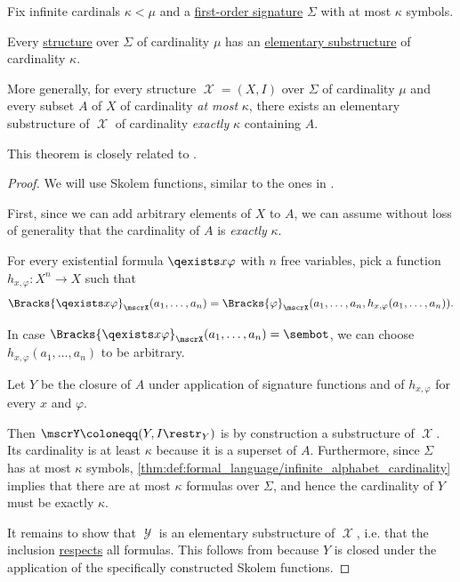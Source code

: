 \begin{theorem}\label{thm:downward_lowenheim_skolem_theorem}
  Fix infinite cardinals \( \kappa < \mu \) and a \hyperref[def:fol_signature]{first-order signature} \( \Sigma \) with at most \( \kappa \) symbols.

  Every \hyperref[def:fol_structure]{structure} over \( \Sigma \) of cardinality \( \mu \) has an \hyperref[def:elementary_embedding]{elementary substructure} of cardinality \( \kappa \).

  More generally, for every structure \( \mscrX = (X, I) \) over \( \Sigma \) of cardinality \( \mu \) and every subset \( A \) of \( X \) of cardinality \emph{at most} \( \kappa \), there exists an elementary substructure of \( \mscrX \) of cardinality \emph{exactly} \( \kappa \) containing \( A \).
\end{theorem}
\begin{comments}
  \item This theorem is closely related to .
\end{comments}
\begin{proof}
  We will use Skolem functions, similar to the ones in .

  First, since we can add arbitrary elements of \( X \) to \( A \), we can assume without loss of generality that the cardinality of \( A \) is \emph{exactly} \( \kappa \).

  For every existential formula \( \qexists x \varphi \) with \( n \) free variables, pick a function \( h_{x,\varphi}: X^n \to X \) such that
  \begin{equation*}
    \Bracks{\qexists x \varphi}_\mscrX(a_1, \ldots, a_n) = \Bracks{\varphi}_\mscrX(a_1, \ldots, a_n, h_{x,\varphi}(a_1, \ldots, a_n)).
  \end{equation*}

  In case \( \Bracks{\qexists x \varphi}_\mscrX(a_1, \ldots, a_n) = \sembot \), we can choose \( h_{x,\varphi}(a_1, \ldots, a_n) \) to be arbitrary.

  Let \( Y \) be the closure of \( A \) under application of signature functions and of \( h_{x,\varphi} \) for every \( x \) and \( \varphi \).

  Then \( \mscrY \coloneqq (Y, I\restr_Y) \) is by construction a substructure of \( \mscrX \). Its cardinality is at least \( \kappa \) because it is a superset of \( A \). Furthermore, since \( \Sigma \) has at most \( \kappa \) symbols, \cref{thm:def:formal_language/infinite_alphabet_cardinality} implies that there are at most \( \kappa \) formulas over \( \Sigma \), and hence the cardinality of \( Y \) must be exactly \( \kappa \).

  It remains to show that \( \mscrY \) is an elementary substructure of \( \mscrX \), i.e. that the inclusion \hyperref[def:fol_function_respect]{respects} all formulas. This follows from  because \( Y \) is closed under the application of the specifically constructed Skolem functions.
\end{proof}

